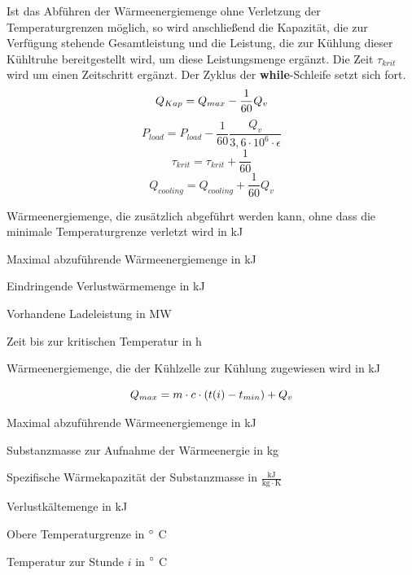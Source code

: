 \begin{description}
Ist das Abf\"uhren der W\"armeenergiemenge ohne Verletzung der Temperaturgrenzen
m\"oglich, so wird anschlie\ss end die Kapazit\"at, die zur Verf\"ugung
stehende Gesamtleistung und die Leistung, die zur K\"uhlung dieser K\"uhltruhe
bereitgestellt wird, um diese Leistungsmenge erg\"anzt. Die Zeit $\tau_{krit}$
wird um einen Zeitschritt erg\"anzt. Der Zyklus der \textbf{while}-Schleife
setzt sich fort.
\begin{equation}
	Q_{Kap} = Q_{max} - \frac{1}{60}Q_v\\
	\label{eq:ap}
\end{equation}
\begin{equation*}
	P_{load} = P_{load} - \frac{1}{60}\frac{Q_v }{3,6 \cdot 10^{6} \cdot
	\epsilon}
\end{equation*}
\begin{equation*}
	\tau_{krit} = \tau_{krit} + \frac{1}{60}
\end{equation*}
\begin{equation*}
	Q_{cooling} = Q_{cooling} + \frac{1}{60}Q_v
\end{equation*}
\begin{description}[\dth]
\item[$Q_{Kap}$] W\"armeenergiemenge, die zus\"atzlich abgef\"uhrt werden kann,
ohne dass die minimale Temperaturgrenze verletzt wird in kJ
\item[$Q_{max}$] Maximal abzuf\"uhrende W\"armeenergiemenge in kJ
\item[$Q_{v}$] Eindringende Verlustw\"armemenge in kJ
\item[$P_{load}$] Vorhandene Ladeleistung in MW
\item[$\tau_{krit}$] Zeit bis zur kritischen Temperatur in h
\item[$Q_{cooling}$] W\"armeenergiemenge, die der K\"uhlzelle zur K\"uhlung
zugewiesen wird in kJ
\end{description} \vspace{0.5cm}
\begin{equation}
	\emax = m \cdot c \cdot (t(i) - t_{min}) + Q_v
\label{emax}
\end{equation}

\begin{description}[\dth]

	\item[$\emax$] Maximal abzuf\"uhrende W\"armeenergiemenge in kJ
	\item[$m$] Substanzmasse zur Aufnahme der Wärmeenergie in kg
	\item[$c$] Spezifische Wärmekapazität der Substanzmasse in $\mathrm{\frac{kJ}{kg
		\cdot K}}$
	\item[$Q_v$] Verlustk\"altemenge in kJ
	\item[$t_{min}$] Obere Temperaturgrenze in  $^\circ$ C
	\item[$t(i)$] Temperatur zur Stunde $i$ in  $^\circ$ C

\end{description}
\vspace{0.5cm}

\end{description}

